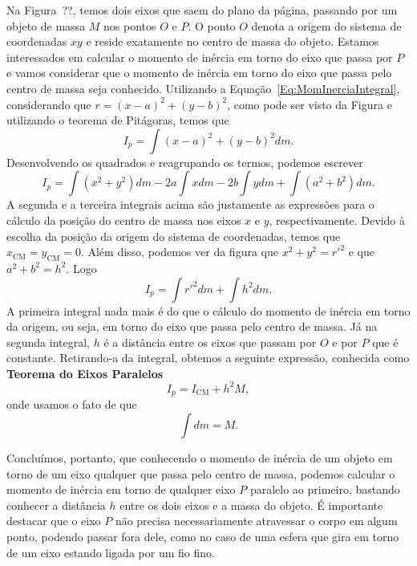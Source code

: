 Na Figura~??, temos dois eixos que saem do plano da página, passando por um objeto de massa $M$ nos pontos $O$ e $P$. O ponto $O$ denota a origem do sistema de coordenadas $xy$ e reside exatamente no centro de massa do objeto. Estamos interessados em calcular o momento de inércia em torno do eixo que passa por $P$ e vamos considerar que o momento de inércia em torno do eixo que passa pelo centro de massa seja conhecido. Utilizando a Equação~\ref{Eq:MomInerciaIntegral}, considerando que $r = (x-a)^2 + (y-b)^2$, como pode ser visto da Figura e utilizando o teorema de Pitágoras, temos que
\begin{equation}
	I_p = \int (x-a)^2 + (y-b)^2 dm.
\end{equation}
%
Desenvolvendo os quadrados e reagrupando os termos, podemos escrever
\begin{equation}
	I_p = \int (x^2 + y^2) dm - 2a \int x dm - 2b \int y dm + \int (a^2 + b^2) dm.
\end{equation}
%
A segunda e a terceira integrais acima são justamente as expressões para o cálculo da posição do centro de massa nos eixos $x$ e $y$, respectivamente. Devido à escolha da posição da origem do sistema de coordenadas, temos que $x_{\textrm{CM}} = y_{\textrm{CM}} = 0$. Além disso, podemos ver da figura que $x^2 + y^2 = r'^2$ e que $a^2 + b^2 = h^2$. Logo
\begin{equation}
	I_p = \int r'^2 dm + \int h^2 dm.
\end{equation}
%
A primeira integral nada mais é do que o cálculo do momento de inércia em torno da origem, ou seja, em torno do eixo que passa pelo centro de massa. Já na segunda integral, $h$ é a distância entre os eixos que passam por $O$ e por $P$ que é constante. Retirando-a da integral, obtemos a seguinte expressão, conhecida como \textbf{Teorema do Eixos Paralelos}
\begin{equation}\label{Eq:TeoremaEixosParalelos}
	I_p = I_{\textrm{CM}} + h^2 M,
\end{equation}
%
onde usamos o fato de que
\begin{equation}
	\int dm = M.
\end{equation}

Concluímos, portanto, que conhecendo o momento de inércia de um objeto em torno de um eixo qualquer que passa pelo centro de massa, podemos calcular o momento de inércia em torno de qualquer eixo $P$ paralelo ao primeiro, bastando conhecer a distância $h$ entre os dois eixos e a massa do objeto. É importante destacar que o eixo $P$ não precisa necessariamente atravessar o corpo em algum ponto, podendo passar fora dele, como no caso de uma esfera que gira em torno de um eixo estando ligada por um fio fino. 

